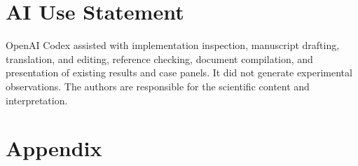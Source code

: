 \documentclass{article}
\begin{document}
\section*{AI Use Statement}
OpenAI Codex assisted with implementation inspection, manuscript drafting, translation, and editing, reference checking, document compilation, and presentation of existing results and case panels. It did not generate experimental observations. The authors are responsible for the scientific content and interpretation.


\section*{Appendix}
\label{appendix-start}

\end{document}
